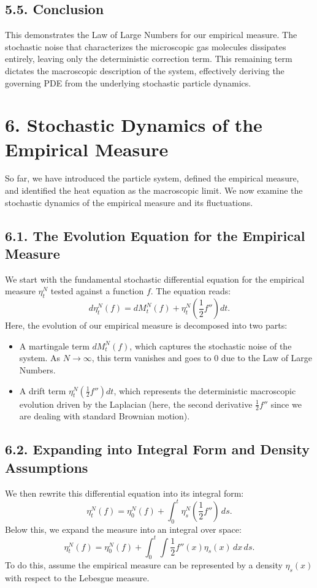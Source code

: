\documentclass[11pt]{article}
\theoremstyle{definition}
\theoremstyle{remark}
\begin{document}
\subsection*{5.5. Conclusion}
This demonstrates the Law of Large Numbers for our empirical measure. The stochastic noise that characterizes the microscopic gas molecules dissipates entirely, leaving only the deterministic correction term. This remaining term dictates the macroscopic description of the system, effectively deriving the governing PDE from the underlying stochastic particle dynamics.

\section*{6. Stochastic Dynamics of the Empirical Measure}
So far, we have introduced the particle system, defined the empirical measure, and identified the heat equation as the macroscopic limit. We now examine the stochastic dynamics of the empirical measure and its fluctuations.

\subsection*{6.1. The Evolution Equation for the Empirical Measure}
We start with the fundamental stochastic differential equation for the empirical measure $\eta_t^N$ tested against a function $f$. The equation reads:
\[
d\eta_t^N(f)=dM_t^N(f)+\eta_t^N\!\left(\frac{1}{2}f''\right)dt.
\]
Here, the evolution of our empirical measure is decomposed into two parts:
\begin{itemize}
\item A martingale term $dM_t^N(f)$, which captures the stochastic noise of the system. As $N\to\infty$, this term vanishes and goes to $0$ due to the Law of Large Numbers.
\item A drift term $\eta_t^N\!\left(\frac{1}{2}f''\right)dt$, which represents the deterministic macroscopic evolution driven by the Laplacian (here, the second derivative $\frac{1}{2}f''$ since we are dealing with standard Brownian motion).
\end{itemize}

\subsection*{6.2. Expanding into Integral Form and Density Assumptions}
We then rewrite this differential equation into its integral form:
\[
\eta_t^N(f)=\eta_0^N(f)+\int_0^t \eta_s^N\!\left(\frac{1}{2}f''\right)\,ds.
\]
Below this, we expand the measure into an integral over space:
\[
\eta_t^N(f)=\eta_0^N(f)+\int_0^t \int \frac{1}{2}f''(x)\eta_s(x)\,dx\,ds.
\]
To do this, assume the empirical measure can be represented by a density $\eta_s(x)$ with respect to the Lebesgue measure.
\end{document}
